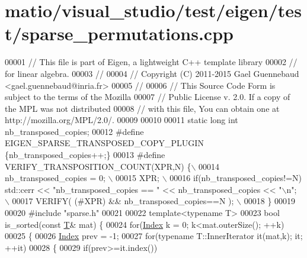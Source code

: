 \hypertarget{matio_2visual__studio_2test_2eigen_2test_2sparse__permutations_8cpp_source}{}\section{matio/visual\+\_\+studio/test/eigen/test/sparse\+\_\+permutations.cpp}
\label{matio_2visual__studio_2test_2eigen_2test_2sparse__permutations_8cpp_source}

\begin{DoxyCode}
00001 \textcolor{comment}{// This file is part of Eigen, a lightweight C++ template library}
00002 \textcolor{comment}{// for linear algebra.}
00003 \textcolor{comment}{//}
00004 \textcolor{comment}{// Copyright (C) 2011-2015 Gael Guennebaud <gael.guennebaud@inria.fr>}
00005 \textcolor{comment}{//}
00006 \textcolor{comment}{// This Source Code Form is subject to the terms of the Mozilla}
00007 \textcolor{comment}{// Public License v. 2.0. If a copy of the MPL was not distributed}
00008 \textcolor{comment}{// with this file, You can obtain one at http://mozilla.org/MPL/2.0/.}
00009 
00010 
00011 \textcolor{keyword}{static} \textcolor{keywordtype}{long} \textcolor{keywordtype}{int} nb\_transposed\_copies;
00012 \textcolor{preprocessor}{#define EIGEN\_SPARSE\_TRANSPOSED\_COPY\_PLUGIN \{nb\_transposed\_copies++;\}}
00013 \textcolor{preprocessor}{#define VERIFY\_TRANSPOSITION\_COUNT(XPR,N) \{\(\backslash\)}
00014 \textcolor{preprocessor}{    nb\_transposed\_copies = 0; \(\backslash\)}
00015 \textcolor{preprocessor}{    XPR; \(\backslash\)}
00016 \textcolor{preprocessor}{    if(nb\_transposed\_copies!=N) std::cerr << "nb\_transposed\_copies == " << nb\_transposed\_copies << "\(\backslash\)n"; \(\backslash\)}
00017 \textcolor{preprocessor}{    VERIFY( (#XPR) && nb\_transposed\_copies==N ); \(\backslash\)}
00018 \textcolor{preprocessor}{  \}}
00019 
00020 \textcolor{preprocessor}{#include "sparse.h"}
00021 
00022 \textcolor{keyword}{template}<\textcolor{keyword}{typename} T>
00023 \textcolor{keywordtype}{bool} is\_sorted(\textcolor{keyword}{const} \hyperlink{group___sparse_core___module}{T}& mat) \{
00024   \textcolor{keywordflow}{for}(\hyperlink{namespace_eigen_a62e77e0933482dafde8fe197d9a2cfde}{Index} k = 0; k<mat.outerSize(); ++k)
00025   \{
00026     \hyperlink{namespace_eigen_a62e77e0933482dafde8fe197d9a2cfde}{Index} prev = -1;
00027     \textcolor{keywordflow}{for}(\textcolor{keyword}{typename} T::InnerIterator it(mat,k); it; ++it)
00028     \{
00029       \textcolor{keywordflow}{if}(prev>=it.index())

\end{DoxyCode}
